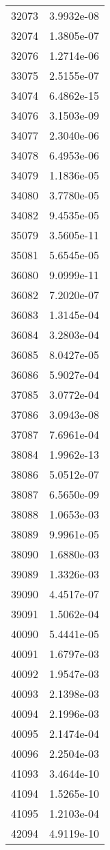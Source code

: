 \begin{table}[h!]
\begin{tabular}{|| c || c |}
32073 & 3.9932e-08 \\
32074 & 1.3805e-07 \\
32076 & 1.2714e-06 \\
33075 & 2.5155e-07 \\
34074 & 6.4862e-15 \\
34076 & 3.1503e-09 \\
34077 & 2.3040e-06 \\
34078 & 6.4953e-06 \\
34079 & 1.1836e-05 \\
34080 & 3.7780e-05 \\
34082 & 9.4535e-05 \\
35079 & 3.5605e-11 \\
35081 & 5.6545e-05 \\
36080 & 9.0999e-11 \\
36082 & 7.2020e-07 \\
36083 & 1.3145e-04 \\
36084 & 3.2803e-04 \\
36085 & 8.0427e-05 \\
36086 & 5.9027e-04 \\
37085 & 3.0772e-04 \\
37086 & 3.0943e-08 \\
37087 & 7.6961e-04 \\
38084 & 1.9962e-13 \\
38086 & 5.0512e-07 \\
38087 & 6.5650e-09 \\
38088 & 1.0653e-03 \\
38089 & 9.9961e-05 \\
38090 & 1.6880e-03 \\
39089 & 1.3326e-03 \\
39090 & 4.4517e-07 \\
39091 & 1.5062e-04 \\
40090 & 5.4441e-05 \\
40091 & 1.6797e-03 \\
40092 & 1.9547e-03 \\
40093 & 2.1398e-03 \\
40094 & 2.1996e-03 \\
40095 & 2.1474e-04 \\
40096 & 2.2504e-03 \\
41093 & 3.4644e-10 \\
41094 & 1.5265e-10 \\
41095 & 1.2103e-04 \\
42094 & 4.9119e-10 \\

\end{tabular}
\end{table}
